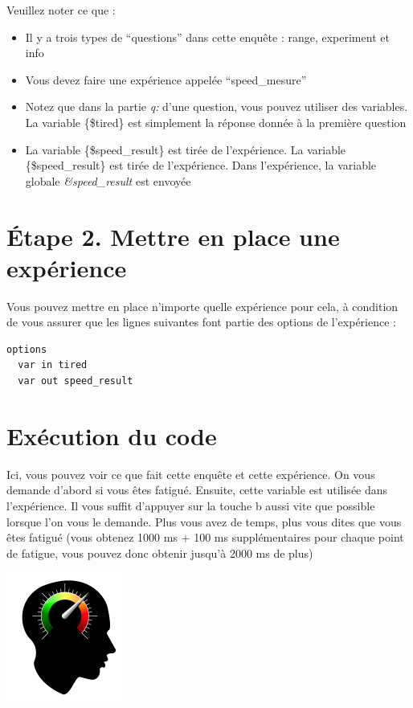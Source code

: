 \documentclass[
]{book}
\providecommand{\tightlist}{%
  \setlength{\itemsep}{0pt}\setlength{\parskip}{0pt}}
\begin{document}
Veuillez noter ce que :

\begin{itemize}
\tightlist
\item
  Il y a trois types de ``questions'' dans cette enquête : range,
  experiment et info
\item
  Vous devez faire une expérience appelée ``speed\_mesure''
\item
  Notez que dans la partie \emph{q:} d'une question, vous pouvez
  utiliser des variables. La variable \{\$tired\} est simplement la
  réponse donnée à la première question
\item
  La variable \{\$speed\_result\} est tirée de l'expérience. La variable
  \{\$speed\_result\} est tirée de l'expérience. Dans l'expérience, la
  variable globale \emph{\&speed\_result} est envoyée
\end{itemize}

\hypertarget{uxe9tape-2.-mettre-en-place-une-expuxe9rience}{%
\section{Étape 2. Mettre en place une
expérience}\label{uxe9tape-2.-mettre-en-place-une-expuxe9rience}}

Vous pouvez mettre en place n'importe quelle expérience pour cela, à
condition de vous assurer que les lignes suivantes font partie des
options de l'expérience :

\begin{verbatim}
options
  var in tired
  var out speed_result
\end{verbatim}

\hypertarget{exuxe9cution-du-code}{%
\section{Exécution du code}\label{exuxe9cution-du-code}}

Ici, vous pouvez voir ce que fait cette enquête et cette expérience. On
vous demande d'abord si vous êtes fatigué. Ensuite, cette variable est
utilisée dans l'expérience. Il vous suffit d'appuyer sur la touche b
aussi vite que possible lorsque l'on vous le demande. Plus vous avez de
temps, plus vous dites que vous êtes fatigué (vous obtenez 1000 ms + 100
ms supplémentaires pour chaque point de fatigue, vous pouvez donc
obtenir jusqu'à 2000 ms de plus)

\href{https://www.psytoolkit.org/cgi-bin/psy2.5.1/survey?s=mpXV3}{\includegraphics{img/RT.jpg}}
\end{document}
